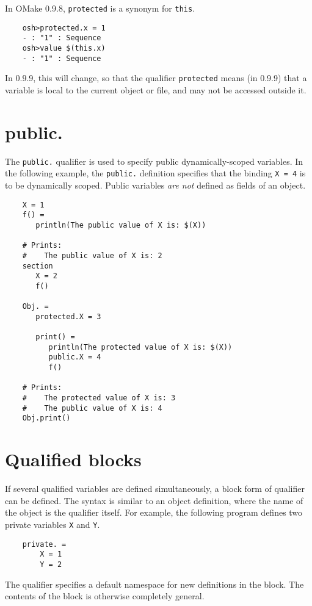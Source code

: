 In OMake 0.9.8, \verb+protected+ is a synonym for \verb+this+.

\begin{verbatim}
    osh>protected.x = 1
    - : "1" : Sequence
    osh>value $(this.x)
    - : "1" : Sequence
\end{verbatim}
%
In 0.9.9, this will change, so that the qualifier \verb+protected+ means (in 0.9.9) that a variable
is local to the current object or file, and may not be accessed outside it.

\section{public.}
\label{section:public}

The \verb+public.+ qualifier is used to specify public dynamically-scoped variables.  In the following
example, the \verb+public.+ definition specifies that the binding \verb+X = 4+ is to be dynamically
scoped.  Public variables \emph{are not} defined as fields of an object.

\begin{verbatim}
    X = 1
    f() =
       println(The public value of X is: $(X))

    # Prints:
    #    The public value of X is: 2
    section
       X = 2
       f()

    Obj. =
       protected.X = 3

       print() =
          println(The protected value of X is: $(X))
          public.X = 4
          f()

    # Prints:
    #    The protected value of X is: 3
    #    The public value of X is: 4
    Obj.print()
\end{verbatim}

\section{Qualified blocks}

If several qualified variables are defined simultaneously, a block form of qualifier can be defined.
The syntax is similar to an object definition, where the name of the object is the qualifier itself.
For example, the following program defines two private variables \verb+X+ and \verb+Y+.

\begin{verbatim}
    private. =
        X = 1
        Y = 2
\end{verbatim}
%
The qualifier specifies a default namespace for new definitions in the block.  The contents of the
block is otherwise completely general.

